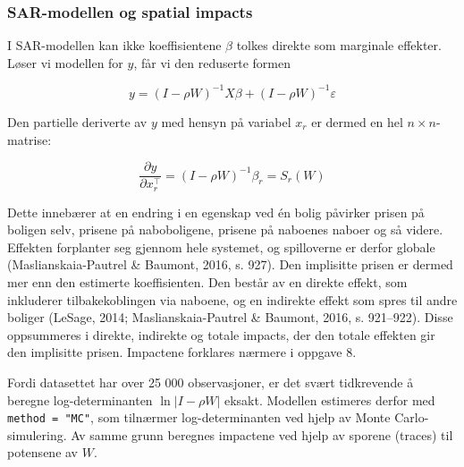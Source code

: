\documentclass[
  norsk,
  a4paper,
]{article}
\begin{document}
\subsubsection{SAR-modellen og spatial
impacts}\label{sar-modellen-og-spatial-impacts}

I SAR-modellen kan ikke koeffisientene \(\beta\) tolkes direkte som
marginale effekter. Løser vi modellen for \(y\), får vi den reduserte
formen

\[y = (I - \rho W)^{-1} X\beta + (I - \rho W)^{-1} \varepsilon\]

Den partielle deriverte av \(y\) med hensyn på variabel \(x_r\) er
dermed en hel \(n \times n\)-matrise:

\[\frac{\partial y}{\partial x_r^{\top}} = (I - \rho W)^{-1} \beta_r = S_r(W)\]

Dette innebærer at en endring i en egenskap ved én bolig påvirker prisen
på boligen selv, prisene på naboboligene, prisene på naboenes naboer og
så videre. Effekten forplanter seg gjennom hele systemet, og spilloverne
er derfor globale (Maslianskaia-Pautrel \& Baumont, 2016, s. 927). Den
implisitte prisen er dermed mer enn den estimerte koeffisienten. Den
består av en direkte effekt, som inkluderer tilbakekoblingen via
naboene, og en indirekte effekt som spres til andre boliger (LeSage,
2014; Maslianskaia-Pautrel \& Baumont, 2016, s. 921--922). Disse
oppsummeres i direkte, indirekte og totale impacts, der den totale
effekten gir den implisitte prisen. Impactene forklares nærmere i
oppgave 8.

Fordi datasettet har over 25 000 observasjoner, er det svært tidkrevende
å beregne log-determinanten \(\ln|I - \rho W|\) eksakt. Modellen
estimeres derfor med \texttt{method\ =\ "MC"}, som tilnærmer
log-determinanten ved hjelp av Monte Carlo-simulering. Av samme grunn
beregnes impactene ved hjelp av sporene (traces) til potensene av \(W\).
\end{document}
